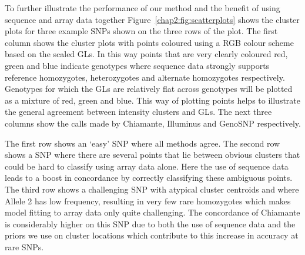 \clearpage
To further illustrate the performance of our method and the benefit of using sequence and array data together Figure~\ref{chap2:fig:scatterplots} shows the cluster plots for three example SNPs shown on the three rows of the plot. The first column shows the cluster plots with points coloured using a RGB colour scheme based on the scaled GLs. In this way points that are very clearly coloured red, green and blue indicate genotypes where sequence data strongly supports reference homozygotes, heterozygotes and alternate homozygotes respectively. Genotypes for which the GLs are relatively flat across genotypes will be plotted as a mixture of red, green and blue. This way of plotting points helps to illustrate the general agreement between intensity clusters and GLs. The next three columns show the calls made by Chiamante, Illuminus and GenoSNP respectively. 

The first row shows an `easy' SNP where all methods agree. The second row shows a SNP where there are several points that lie between obvious clusters that could be hard to classify using array data alone. Here the use of sequence data leads to a boost in concordance by correctly classifying these ambiguous points. The third row shows a challenging SNP with atypical cluster centroids and where Allele 2 has low frequency, resulting in very few rare homozygotes which makes model fitting to array data only quite challenging. The concordance of Chiamante is considerably higher on this SNP due to both the use of sequence data and the priors we use on cluster locations which contribute to this increase in accuracy at rare SNPs.


